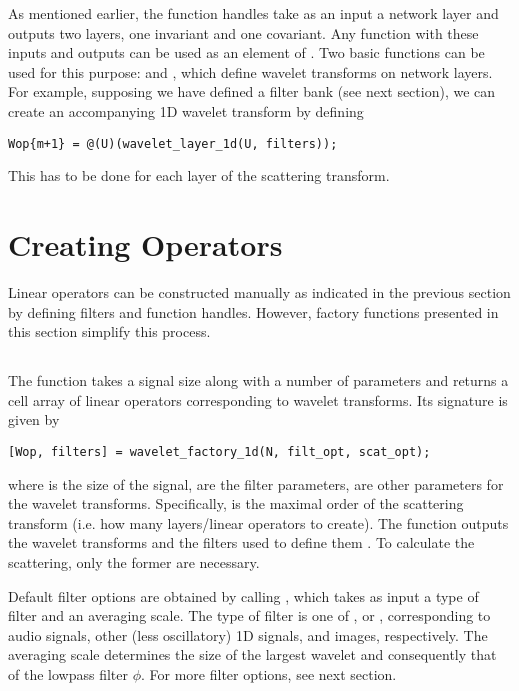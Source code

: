 \documentclass[twocolumn]{article}
\begin{document}
As mentioned earlier, the  function handles take as an input a network layer and outputs two layers, one invariant and one covariant. Any function with these inputs and outputs can be used as an element of . Two basic functions can be used for this purpose:  and , which define wavelet transforms on network layers. For example, supposing we have defined a filter bank  (see next section), we can create an accompanying 1D wavelet transform by defining
\begin{lstlisting}
Wop{m+1} = @(U)(wavelet_layer_1d(U, filters));
\end{lstlisting}
This has to be done for each layer of the scattering transform.

\section{Creating Operators}

Linear operators can be constructed manually as indicated in the previous section by defining filters and function handles. However, factory functions presented in this section simplify this process.

\subsection{}

The  function takes a signal size along with a number of parameters and returns a cell array of linear operators corresponding to wavelet transforms. Its signature is given by
\begin{lstlisting}
[Wop, filters] = wavelet_factory_1d(N, filt_opt, scat_opt);
\end{lstlisting}
where  is the size of the signal,  are the filter parameters,  are other parameters for the wavelet transforms. Specifically,  is the maximal order of the scattering transform (i.e. how many layers/linear operators to create). The function outputs the wavelet transforms  and the filters used to define them . To calculate the scattering, only the former are necessary.

Default filter options are obtained by calling , which takes as input a type of filter and an averaging scale. The type of filter is one of ,  or , corresponding to audio signals, other (less oscillatory) 1D signals, and images, respectively. The averaging scale determines the size of the largest wavelet and consequently that of the lowpass filter $\phi$. For more filter options, see next section.
\end{document}
